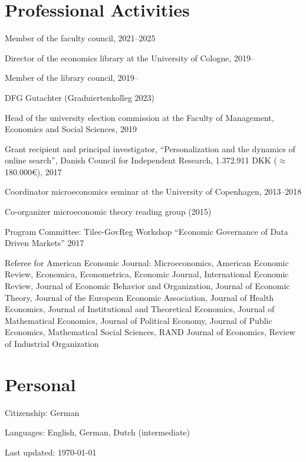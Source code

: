 \documentclass[a4paper]{article}
\def\footerlink{}
\renewenvironment{itemize}{
  \begin{list}{}{
    \setlength{\leftmargin}{1.5em}
  }
}{
  \end{list}
}
\begin{document}
\section*{Professional Activities}
\begin{itemize}
\item Member of the faculty council, 2021--2025
\item Director of the economics library at the University of Cologne, 2019--
\item Member of the library council, 2019--
\item DFG Gutachter (Graduiertenkolleg 2023)
  \item Head of the university election commission at the Faculty of Management, Economics and Social Sciences, 2019
\item Grant recipient and principal investigator, ``Personalization and the dynamics of online search'', Danish Council for Independent Research, 1.372.911 DKK ($\approx$180.000\euro), 2017
\item Coordinator microeconomics seminar at the University of Copenhagen, 2013--2018
\item Co-organizer microeconomic theory reading group (2015)
  \item Program Committee: Tilec-GovReg Workshop ``Economic Governance of Data Driven Markets'' 2017
\item Referee for American Economic Journal: Microeconomics, American Economic Review, Economica, Econometrica, Economic Journal, International Economic Review, Journal of Economic Behavior and Organization, Journal of Economic Theory, Journal of the European Economic Association, Journal of Health Economics, Journal of Institutional and Theoretical Economics, Journal of Mathematical Economics, Journal of Political Economy, Journal of Public Economics, Mathematical Social Sciences, RAND Journal of Economics, Review of Industrial Organization
\end{itemize}


\section*{Personal}

\begin{itemize}
\item Citizenship: German
\item Languages: English, German, Dutch (intermediate)
\end{itemize}


\null\vfill %
\begin{center}
  \begin{footnotesize}
    Last updated: \today \\
    \href{\footerlink}{\texttt{\footerlink}}
  \end{footnotesize}
\end{center}
\end{document}
